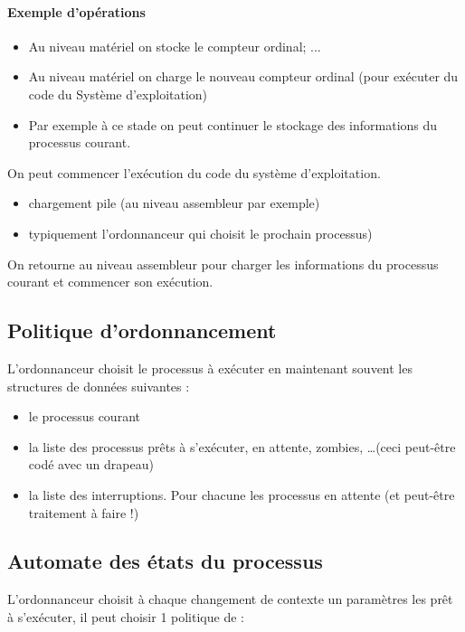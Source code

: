 \documentclass[11pt, a4paper]{article}
\begin{document}
\paragraph{Exemple d'opérations}

\begin{itemize}
\item Au niveau matériel on stocke le compteur ordinal; ...
\item Au niveau matériel on charge le nouveau compteur ordinal (pour exécuter du code du Système d'exploitation)
\item Par exemple à ce stade on peut continuer le stockage des informations du processus courant.
\end{itemize}

On peut commencer l’exécution  du code du système d'exploitation.

\begin{itemize}
    \item chargement pile (au niveau assembleur par exemple)
    \item typiquement l’ordonnanceur qui choisit le prochain processus)
\end{itemize}

On retourne au niveau assembleur pour charger les informations du processus courant et commencer son exécution.

\subsection{Politique d'ordonnancement}

L'ordonnanceur choisit le processus à exécuter en maintenant souvent les structures de données suivantes :

\begin{itemize}
\item le processus courant 
\item la liste des processus prêts à s'exécuter, en attente, zombies, \dots (ceci peut-être codé avec un drapeau)
\item la liste des interruptions. Pour chacune les processus en attente (et peut-être traitement à faire !)
\end{itemize}

\subsection{Automate des états du processus}

L'ordonnanceur choisit à chaque changement de contexte un paramètres les prêt à s'exécuter, il peut choisir 1 politique de :
\end{document}
